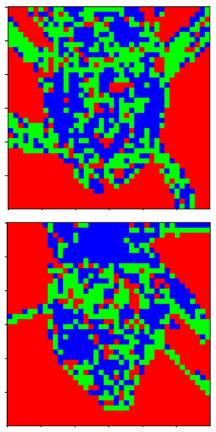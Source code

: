 \documentclass{aci}
\numberwithin{equation}{section}
\begin{document}
\begin{figure}
\begin{subfigure}{\segmentedsubwidth}
    \end{subfigure}
    \begin{subfigure}{\segmentedsubwidth}
        \includegraphics[width=1\linewidth]{figs/15/s105.png}
    \end{subfigure}
    \begin{subfigure}{\segmentedsubwidth}
        \includegraphics[width=1\linewidth]{figs/15/s107.png}
    \end{subfigure}


\end{figure}
\end{document}
